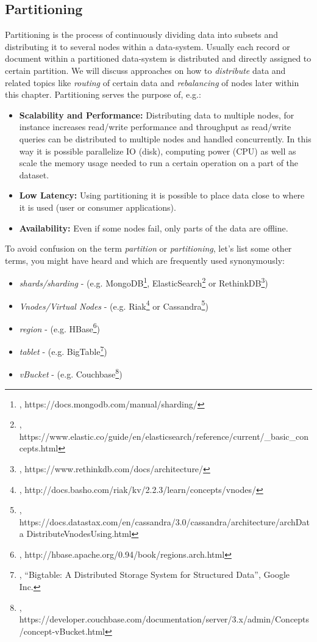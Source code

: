 {\subsection{Partitioning}
\label{tf_dds_partitioning}
Partitioning is the process of continuously dividing data into subsets and distributing it to several nodes within a data-system. Usually each record or document within a partitioned data-system is distributed and directly assigned to certain partition. We will discuss approaches on how to \textit{distribute} data and related topics like \textit{routing} of certain data and \textit{rebalancing} of nodes later within this chapter. Partitioning serves the purpose of, e.g.:\\
\begin{itemize}
\item \textbf{Scalability and Performance:} Distributing data to multiple nodes, for instance increases read/write performance and throughput as read/write queries can be distributed to multiple nodes and handled concurrently. In this way it is possible parallelize IO (disk), computing power (CPU) as well as scale the memory usage needed to run a certain operation on a part of the dataset.  
\item \textbf{Low Latency:} Using partitioning it is possible to place data close to where it is used (user or consumer applications).
\item \textbf{Availability:} Even if some nodes fail, only parts of the data are offline. \\
\end{itemize}

To avoid confusion on the term \textit{partition} or \textit{partitioning}, let's list some other terms, you might have heard and which are frequently used synonymously:
\begin{itemize}
\item \textit{shards/sharding} - (e.g. MongoDB\footnote{\cite{MDBPAR}, https://docs.mongodb.com/manual/sharding/}, ElasticSearch\footnote{\cite{ELAPAR}, https://www.elastic.co/guide/en/elasticsearch/reference/current/\_basic\_concepts.html} or RethinkDB\footnote{\cite{RDBPAR}, https://www.rethinkdb.com/docs/architecture/})
\item \textit{Vnodes/Virtual Nodes} - (e.g. Riak\footnote{\cite{RIAKPAR}, http://docs.basho.com/riak/kv/2.2.3/learn/concepts/vnodes/} or Cassandra\footnote{\cite{CASPAR}, https://docs.datastax.com/en/cassandra/3.0/cassandra/architecture/archData DistributeVnodesUsing.html})
\item \textit{region} - (e.g. HBase\footnote{\cite{HBASEPAR}, http://hbase.apache.org/0.94/book/regions.arch.html})
\item \textit{tablet} - (e.g. BigTable\footnote{\cite{BTPAR}, ``Bigtable: A Distributed Storage System for Structured Data'', Google Inc.})
\item \textit{vBucket} - (e.g. Couchbase\footnote{\cite{CBPAR}, https://developer.couchbase.com/documentation/server/3.x/admin/Concepts/concept-vBucket.html})
\end{itemize}

}
